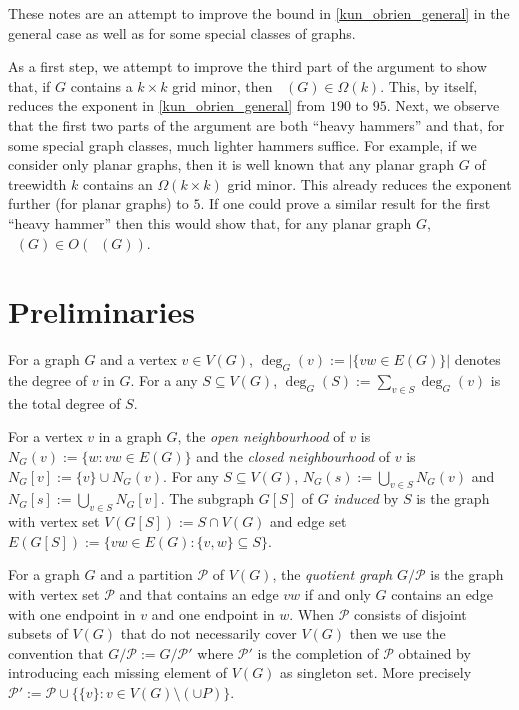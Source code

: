 \documentclass{patmorin}
\DeclareMathOperator{\chicen}{\chi_{\mathrm{cen}}}
\DeclareMathOperator{\chilin}{\chi_{\mathrm{lin}}}
\begin{document}
These notes are an attempt to improve the bound in \cref{kun_obrien_general} in the general case as well as for some special classes of graphs.

As a first step, we attempt to improve the third part of the argument to show that, if $G$ contains a $k\times k$ grid minor, then $\chilin(G)\in \Omega(k)$.  This, by itself, reduces the exponent in \cref{kun_obrien_general} from $190$ to $95$.  Next, we observe that the first two parts of the argument are both ``heavy hammers'' and that, for some special graph classes, much lighter hammers suffice.  For example, if we consider only planar graphs, then it is well known that any planar graph $G$ of treewidth $k$ contains an $\Omega(k\times k)$ grid minor.  This already reduces the exponent further (for planar graphs) to $5$.  If one could prove a similar result for the first ``heavy hammer'' then this would show that, for any planar graph $G$, $\chicen(G)\in O(\chilin(G))$.


\section{Preliminaries}

For a graph $G$ and a vertex $v\in V(G)$, $\deg_G(v):=|\{vw\in E(G)\}|$ denotes the degree of $v$ in $G$.  For a any $S\subseteq V(G)$, $\deg_G(S):=\sum_{v\in S}\deg_G(v)$ is the total degree of $S$.

For a vertex $v$ in a graph $G$, the \emph{open neighbourhood} of $v$ is $N_G(v):=\{w:vw\in E(G)\}$ and the \emph{closed neighbourhood} of $v$ is $N_G[v]:=\{v\}\cup N_G(v)$.  For any $S\subseteq V(G)$, $N_G(s):=\bigcup_{v\in S}N_G(v)$ and $N_G[s]:=\bigcup_{v\in S}N_G[v]$.  The subgraph $G[S]$ of $G$ \emph{induced} by $S$ is the graph with vertex set $V(G[S]):=S\cap V(G)$ and edge set $E(G[S]):=\{vw\in E(G):\{v,w\}\subseteq S\}$.


For a graph $G$ and a partition $\mathcal{P}$ of $V(G)$, the \emph{quotient graph} $G/\mathcal{P}$ is the graph with vertex set $\mathcal{P}$ and that contains an edge $vw$ if and only $G$ contains an edge with one endpoint in $v$ and one endpoint in $w$.  When $\mathcal{P}$ consists of disjoint subsets of $V(G)$ that do not necessarily cover $V(G)$ then we use the convention that $G/\mathcal{P}:=G/\mathcal{P'}$ where $\mathcal{P}'$ is the completion of $\mathcal{P}$ obtained by introducing each missing element of $V(G)$ as singleton set.  More precisely $\mathcal{P'}:=\mathcal{P}\cup\{\{v\}:v\in V(G)\setminus(\cup P)\}$.
\end{document}
